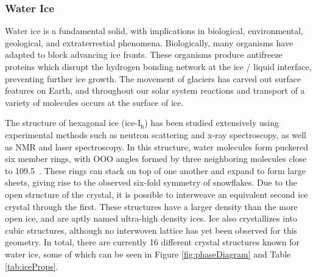 \subsubsection{Water Ice}
%
%
Water ice is a fundamental solid, with implications in biological,
environmental, geological, and extraterrestial
phenomena.\cite{Shultz2017} Biologically, many organisms have adapted
to block advancing ice fronts. These organisms produce antifreeze
proteins which disrupt the hydrogen bonding network at the ice /
liquid interface, preventing further ice growth. The movement of
glaciers has carved out surface features on Earth, and throughout our
solar system reactions and transport of a variety of molecules
occurs at the surface of ice.


The structure of hexagonal ice (ice-I$_\mathrm{h}$) has been studied
extensively using experimental methods such as neutron scattering and
x-ray spectroscopy, as well as NMR and laser
spectroscopy.\cite{Kuhs2012} In this structure, water molecules form
puckered six member rings, with OOO angles formed by three neighboring
molecules close to 109.5\degree~. These rings can stack on top of one
another and expand to form large sheets, giving rise to the observed
six-fold symmetry of snowflakes. Due to the open structure of the
crystal, it is possible to interweave an equivalent second ice crystal
through the first. These structures have a larger density than the
more open ice, and are aptly named ultra-high density ices. Ice also
crystallizes into cubic structures, although no interwoven lattice has
yet been observed for this geometry. In total, there are currently 16
different crystal structures known for water ice, some of which can be
seen in Figure \ref{fig:phaseDiagram} and Table \ref{tab:iceProps}.

